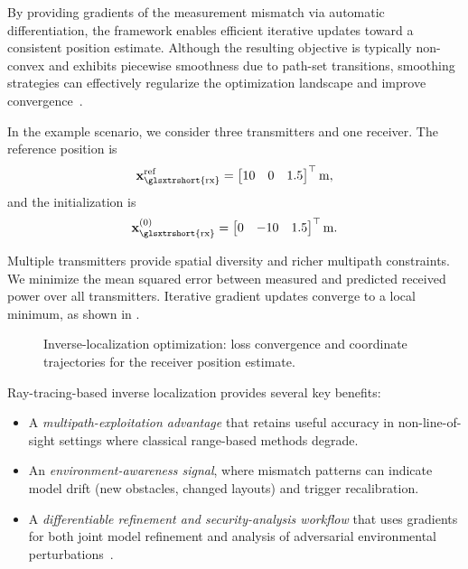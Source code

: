 By providing gradients of the measurement mismatch via automatic differentiation, the framework enables efficient iterative updates toward a consistent position estimate. Although the resulting objective is typically non-convex and exhibits piecewise smoothness due to path-set transitions, smoothing strategies can effectively regularize the optimization landscape and improve convergence~.

In the example scenario, we consider three transmitters and one receiver. The reference position is
\begin{equation}
  \bsup{x}_\text{\glsxtrshort{rx}}^{\mathrm{ref}} =
  \begin{bmatrix} 10 & 0 & 1.5
  \end{bmatrix}^\top \unit{\meter},
\end{equation}
and the initialization is
\begin{equation}
  \bsup{x}_\text{\glsxtrshort{rx}}^{(0)} =
  \begin{bmatrix} 0 & -10 & 1.5
  \end{bmatrix}^\top \unit{\meter}.
\end{equation}

Multiple transmitters provide spatial diversity and richer multipath constraints. We minimize the mean squared error between measured and predicted received power over all transmitters. Iterative gradient updates converge to a local minimum, as shown in .

\begin{figure}
  \centering
  \caption{Inverse-localization optimization: loss convergence and coordinate trajectories for the receiver position estimate.}
\end{figure}

Ray-tracing-based inverse localization provides several key benefits:
\begin{itemize}
  \item A \emph{multipath-exploitation advantage} that retains useful accuracy in non-\gls{line-of-sight} settings where classical range-based methods degrade.
  \item An \emph{environment-awareness signal}, where mismatch patterns can indicate model drift (new obstacles, changed layouts) and trigger recalibration.
  \item A \emph{differentiable refinement and security-analysis workflow} that uses gradients for both joint model refinement and analysis of adversarial environmental perturbations~.
\end{itemize}

